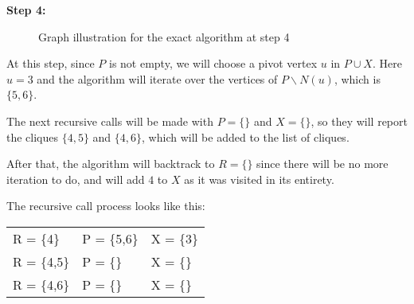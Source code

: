 \begin{minipage}{\linewidth}
    \textbf{Step 4:}

    \begin{minipage}{0.4\textwidth}
        \begin{figure}[H]
            \centering
            \caption{Graph illustration for the exact algorithm at step 4}
            \label{fig:exact-mewc-step4}
        \end{figure}
    \end{minipage}
    \hspace{0.04\linewidth}
    \begin{minipage}{0.55\textwidth}
        At this step, since $P$ is not empty, we will choose a pivot vertex $u$
        in $P\cup X$. Here $u = 3$ and the algorithm will iterate over the
        vertices of $P\backslash N(u)$, which is $\{5,6\}$. \bigskip

        The next recursive calls will be made with $P = \{\}$ and $X = \{\}$, so
        they will report the cliques $\{4,5\}$ and $\{4,6\}$, which will be
        added to the list of cliques. \bigskip

        After that, the algorithm will backtrack to $R=\{\}$ since there will be
        no more iteration to do, and will add $4$ to $X$ as it was visited in
        its entirety. \bigskip

        The recursive call process looks like this:
        \begin{center}
            \begin{tabular}{|lll|}
                \hline
                R = \{4\}   & P = \{5,6\} & X = \{3\} \\
                R = \{4,5\} & P = \{\}    & X = \{\}  \\
                R = \{4,6\} & P = \{\}    & X = \{\}  \\
                \hline
            \end{tabular}
        \end{center}
    \end{minipage}
\end{minipage} \bigskip

